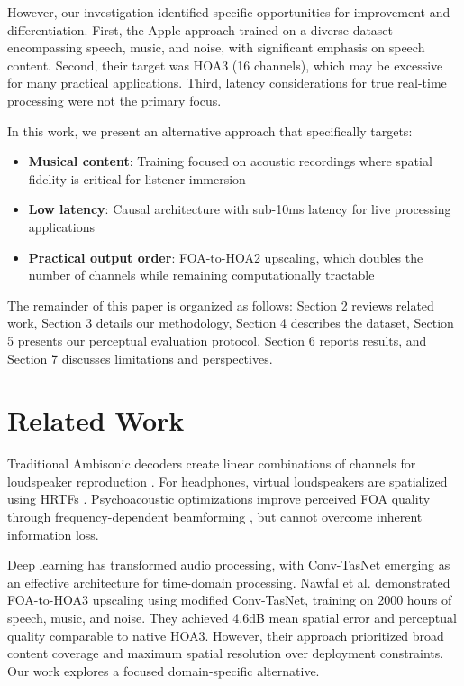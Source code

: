 \documentclass[10pt,twocolumn]{article}
\begin{document}
However, our investigation identified specific opportunities for improvement and differentiation. First, the Apple approach trained on a diverse dataset encompassing speech, music, and noise, with significant emphasis on speech content. Second, their target was HOA3 (16 channels), which may be excessive for many practical applications. Third, latency considerations for true real-time processing were not the primary focus.

In this work, we present an alternative approach that specifically targets:
\begin{itemize}
    \item \textbf{Musical content}: Training focused on acoustic recordings where spatial fidelity is critical for listener immersion
    \item \textbf{Low latency}: Causal architecture with sub-10ms latency for live processing applications
    \item \textbf{Practical output order}: FOA-to-HOA2 upscaling, which doubles the number of channels while remaining computationally tractable
\end{itemize}

The remainder of this paper is organized as follows: Section 2 reviews related work, Section 3 details our methodology, Section 4 describes the dataset, Section 5 presents our perceptual evaluation protocol, Section 6 reports results, and Section 7 discusses limitations and perspectives.

\section{Related Work}

Traditional Ambisonic decoders create linear combinations of channels for loudspeaker reproduction \cite{zotter2019ambisonics}. For headphones, virtual loudspeakers are spatialized using HRTFs \cite{benhur2021binaural}. Psychoacoustic optimizations improve perceived FOA quality through frequency-dependent beamforming \cite{gerzon1992ambisonic}, but cannot overcome inherent information loss.

Deep learning has transformed audio processing, with Conv-TasNet \cite{luo2019convtasnet} emerging as an effective architecture for time-domain processing. Nawfal et al. \cite{nawfal2025ambisonics} demonstrated FOA-to-HOA3 upscaling using modified Conv-TasNet, training on 2000 hours of speech, music, and noise. They achieved 4.6dB mean spatial error and perceptual quality comparable to native HOA3. However, their approach prioritized broad content coverage and maximum spatial resolution over deployment constraints. Our work explores a focused domain-specific alternative.
\end{document}
